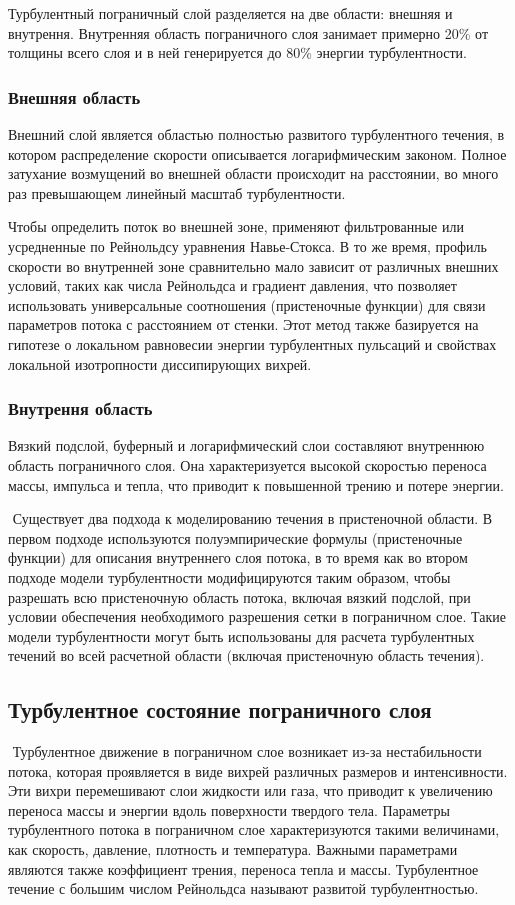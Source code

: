 \documentclass[a4paper]{article}
\begin{document}
		Турбулентный пограничный слой разделяется на две области: внешняя и внутрення. Внутренняя область пограничного слоя занимает примерно 20\% от толщины всего слоя и в ней генерируется до 80\% энергии турбулентности.
		
	\subsubsection{Внешняя область}
		
		Внешний слой является областью полностью развитого турбулентного течения, в котором распределение скорости описывается логарифмическим законом. Полное затухание возмущений во внешней области происходит на расстоянии, во много раз превышающем линейный масштаб турбулентности.
		‍
		
		Чтобы определить поток во внешней зоне, применяют фильтрованные или усредненные по Рейнольдсу уравнения Навье-Стокса. В то же время, профиль скорости во внутренней зоне сравнительно мало зависит от различных внешних условий, таких как числа Рейнольдса и градиент давления, что позволяет использовать универсальные соотношения (пристеночные функции) для связи параметров потока с расстоянием от стенки. Этот метод также базируется на гипотезе о локальном равновесии энергии турбулентных пульсаций и свойствах локальной изотропности диссипирующих вихрей.
		
	\subsubsection{Внутрення область}
	
		Вязкий подслой, буферный и логарифмический слои составляют внутреннюю область пограничного слоя. Она характеризуется высокой скоростью переноса массы, импульса и тепла, что приводит к повышенной трению и потере энергии.
		
		‍
		Существует два подхода к моделированию течения в пристеночной области. В первом подходе используются полуэмпирические формулы (пристеночные функции) для описания внутреннего слоя потока, в то время как во втором подходе модели турбулентности модифицируются таким образом, чтобы разрешать всю пристеночную область потока, включая вязкий подслой, при условии обеспечения необходимого разрешения сетки в пограничном слое. Такие модели турбулентности могут быть использованы для расчета турбулентных течений во всей расчетной области (включая пристеночную область течения).
	\subsection{Турбулентное состояние пограничного слоя}
	‍
		Турбулентное движение в пограничном слое возникает из-за нестабильности потока, которая проявляется в виде вихрей различных размеров и интенсивности. Эти вихри перемешивают слои жидкости или газа, что приводит к увеличению переноса массы и энергии вдоль поверхности твердого тела. Параметры турбулентного потока в пограничном слое характеризуются такими величинами, как скорость, давление, плотность и температура. Важными параметрами являются также коэффициент трения, переноса тепла и массы. Турбулентное течение с большим числом Рейнольдса называют развитой турбулентностью.
		
\end{document}
